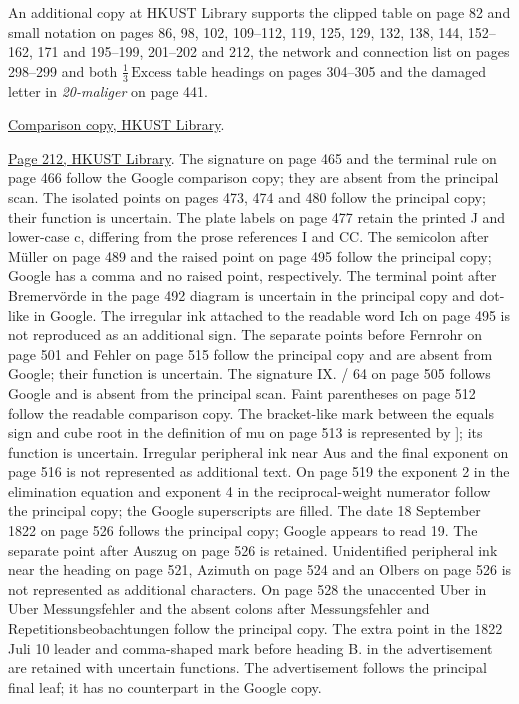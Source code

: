 An additional copy at HKUST Library supports the clipped table on page 82 and small notation on pages 86, 98, 102, 109--112, 119, 125, 129, 132, 138, 144,
152--162, 171 and 195--199,
201--202 and 212, the network and connection list on
pages 298--299 and both \(\tfrac13\,\text{Excess}\) table headings on pages 304--305 and the damaged letter in
\textit{20-maliger} on page 441.\par
\noindent\href{https://lbezone.hkust.edu.hk/rse/?p=13258}{Comparison copy, HKUST Library}.\par
\noindent\href{https://lbezone.hkust.edu.hk/obj/4/o/b761099/v9/pg00220.jpg}{Page 212, HKUST Library}.
The signature on page 465 and the terminal rule on page 466 follow the
Google comparison copy; they are absent from the principal scan.
The isolated points on pages 473, 474 and 480 follow the principal copy;
their function is uncertain. The plate labels on page 477 retain the
printed J and lower-case c, differing from the prose references I and CC.
The semicolon after Müller on page 489 and the raised point on page 495
follow the principal copy; Google has a comma and no raised point, respectively.
The terminal point after Bremervörde in the page 492 diagram is uncertain
in the principal copy and dot-like in Google. The irregular ink attached
to the readable word Ich on page 495 is not reproduced as an additional sign.
The separate points before Fernrohr on page 501 and Fehler on page 515
follow the principal copy and are absent from Google; their function is uncertain.
The signature IX. / 64 on page 505 follows Google and is absent from the
principal scan. Faint parentheses on page 512 follow the readable comparison
copy. The bracket-like mark between the equals sign and cube root in the
definition of mu on page 513 is represented by ]; its function is uncertain.
Irregular peripheral ink near Aus and the final exponent on page 516 is
not represented as additional text.
On page 519 the exponent 2 in the elimination equation and exponent 4
in the reciprocal-weight numerator follow the principal copy; the Google
superscripts are filled. The date 18 September 1822 on page 526 follows
the principal copy; Google appears to read 19. The separate point after
Auszug on page 526 is retained. Unidentified peripheral ink near the
heading on page 521, Azimuth on page 524 and an Olbers on page 526 is
not represented as additional characters. On page 528 the unaccented Uber
in Uber Messungsfehler and the absent colons after Messungsfehler and
Repetitionsbeobachtungen follow the principal copy. The extra point in
the 1822 Juli 10 leader and comma-shaped mark before heading B. in the
advertisement are retained with uncertain functions. The advertisement
follows the principal final leaf; it has no counterpart in the Google copy.

